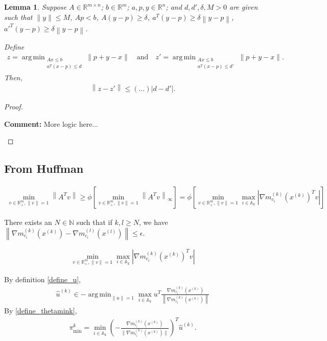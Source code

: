 \documentclass{article}
\newenvironment{comment}
  {\par\medskip
   \color{red}%
   \begin{framed}
   \textbf{Comment: }\ignorespaces}
 {\end{framed}
  \medskip}
\newtheorem{lemma}[theorem]{Lemma}
\theoremstyle{case}
\numberwithin{theorem}{subsection}
\DeclareMathOperator*{\argmin}{arg\,min}
\newcommand{\activeconstraintsk}{{\mathbb A_{k}}}
\newcommand{\gmcik}{{\nabla m_{c_i}^{(k)}\left(\xk\right)}}
\newcommand{\hgik}{{\frac{\nabla m^{(k)}_{c_i}(\xk)}{\|\nabla m^{(k)}_{c_i}\left(\xk\right)\|}}}
\newcommand{\huk}{{{\hat u}^{(k)}}}
\newcommand{\mcik}{{{m}^{(k)}_{c_i}}}
\newcommand{\mcil}{{{m}^{(l)}_{c_i}}}
\newcommand{\naturals}{\mathbb N}
\newcommand{\reals}{\mathbb R}
\newcommand{\Rm}{\mathbb R^m}
\newcommand{\Rn}{\mathbb R^n}
\newcommand{\thetamink}{{\pi^k_{\textrm{min}}}}
\newcommand{\xk}{x^{(k)}}
\newcommand{\xl}{{x^{(l)}}}
\begin{document}
\begin{lemma}
Suppose
$A \in \reals^{m \times n}$;
$b \in \Rm$;
$a, p, y \in \Rn$;
and $d, d', \delta, M > 0$
are given such that
$\|y\| \le M$, $Ap < b$, $A (y - p) \ge \delta$, $a^T(y - p) \ge \delta \left\|y - p\right\|$, ${a'}^T(y - p) \ge \delta \left\|y - p\right\|$.

Define
\begin{align*}
z  = \argmin_{\substack{Ax \le b \\ a^T \left(x - p\right) \le d}} \|p + y - x\|
\quad \textrm{and} \quad
z' = \argmin_{\substack{Ax \le b \\ {a}^T \left(x - p\right) \le d'}} \|p + y - x\|.
\end{align*}
Then, 
\begin{align*}
\left\|z - z'\right\| \le \left(\ldots\right) |d - d'|.
\end{align*}
\end{lemma}
\begin{proof}
\begin{comment}
More logic here...
\end{comment}
\end{proof}





\subsection{From Huffman}




\color{red}
\begin{align*}
\min_{v \in \Rm_+, \|v\| = 1} \left\|A^Tv\right\| 
\ge \phi \left[\min_{v \in \Rm_+, \|v\| = 1} \left\|A^Tv\right\|_{\infty}\right] 
=   \phi \left[\min_{v \in \Rm_+, \|v\| = 1} \max_{i \in \activeconstraintsk} \left|\gmcik^T v\right|\right]
\end{align*}



There exists an $N \in \naturals$ such that if $k, l \ge N$, we have $\left\|\nabla \mcik\left(\xk\right) - \nabla \mcil\left(\xl\right) \right\| \le \epsilon$.

\begin{align*}
\min_{v \in \Rm_+, \|v\| = 1} \max_{i \in \activeconstraintsk} \left|\gmcik^T v\right|
\end{align*}


By definition \cref{define_u},
\begin{align*}
\huk \in -\argmin_{\|u\| = 1} \max_{i \in \activeconstraintsk} u^T \frac{\gmcik}{\left\|\gmcik\right\|}
\end{align*}
By \cref{define_thetamink},
\begin{align*}
\thetamink = \min_{i \in \activeconstraintsk} \left(-\hgik\right)^T \huk.
\end{align*}
\end{document}
